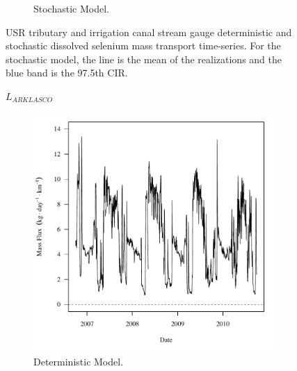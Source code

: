 \begin{landscape}
\begin{figure}
\begin{subfigure}{0.7\textwidth}
			\caption{Stochastic Model.}
		\end{subfigure}
		\caption[USR tributary and irrigation canal stream gauge deterministic and stochastic dissolved selenium mass transport time-series.]{USR tributary and irrigation canal stream gauge deterministic and stochastic dissolved selenium mass transport time-series.  For the stochastic model, the line is the mean of the realizations and the blue band is the 97.5th CIR.}
		\label{fig:massTrans_USR}
	\end{figure}
\end{landscape}
\subfiguremid
\begin{landscape}
	\begin{figure}
		$ \displaystyle L_{ARKLASCO} $
		\begin{subfigure}{0.7\textwidth}
			\centering
			\includegraphics[width=\tableCustomSize]{"Figures/Results_USR/Deterministic/f U201"}
			\caption{Deterministic Model.}
		\end{subfigure}%
		\begin{subfigure}{0.7\textwidth}
			\centering

\end{subfigure}
\end{figure}
\end{landscape}
